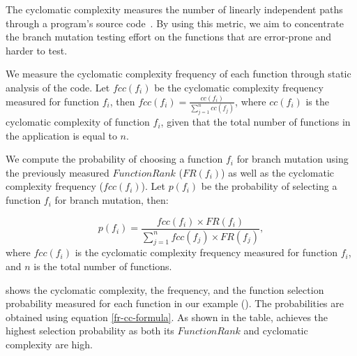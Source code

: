 The cyclomatic complexity measures the number of linearly independent paths through a program's source code~\cite{mccabe:tse76}. By using this metric, we aim to 
concentrate the branch mutation testing effort on the functions that are error-prone and harder to test.

We measure the cyclomatic complexity frequency of each function through static analysis of the code. Let $fcc(f_i)$ be the cyclomatic complexity frequency measured for function $f_i$, then $fcc(f_i)=\frac{cc(f_i)}{\sum _{j=1}^{n} cc(f_j)}$,  
where $cc(f_i)$ is the cyclomatic complexity of function $f_i$, given that the total number of functions in the application
is equal to $n$.

We compute the probability of choosing a function $f_i$ for branch mutation using the previously measured $FunctionRank$ ($FR(f_i)$) as well as the cyclomatic complexity frequency ($fcc(f_i)$). Let $p(f_i)$ be the probability of selecting a function $f_i$ for branch mutation, then:

\begin{equation}
p(f_i)= \frac{fcc(f_i) \times FR(f_i)}{\sum _{j=1}^{n} fcc(f_j) \times FR(f_j)},
\label{fr-cc-formula}
\end{equation} 
where $fcc(f_i)$ is the cyclomatic complexity frequency measured for function $f_i$, and $n$ is the total number of  functions.


 shows the cyclomatic complexity, the frequency, and the function selection
probability measured for each function in our example (). The probabilities are obtained using equation \ref{fr-cc-formula}.
As shown in the table,  achieves the highest selection probability as both its $FunctionRank$ and cyclomatic complexity
are high.

